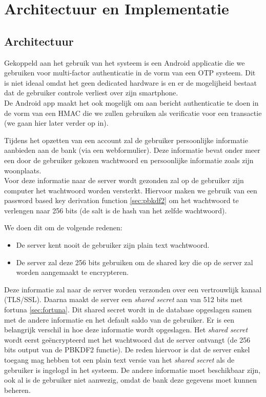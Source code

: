 \documentclass[11pt]{article}
\begin{document}
\section{Architectuur en Implementatie}
\subsection{Architectuur}
Gekoppeld aan het gebruik van het systeem is een Android applicatie die we gebruiken voor multi-factor authenticatie in de vorm van een OTP systeem. Dit is niet ideaal omdat het geen dedicated hardware is en er de mogelijheid bestaat dat de gebruiker controle verliest over zijn smartphone.\\

De Android app maakt het ook mogelijk om aan bericht authenticatie te doen in de vorm van een HMAC die we zullen gebruiken als verificatie voor een transactie (we gaan hier later verder op in).

Tijdens het opzetten van een account zal de gebruiker persoonlijke informatie aanbieden aan de bank (via een webformulier). Deze informatie bevat onder meer een door de gebruiker gekozen wachtwoord en persoonlijke informatie zoals zijn  woonplaats.\\

Voor deze informatie naar de server wordt gezonden zal op de gebruiker zijn computer het wachtwoord worden versterkt. Hiervoor maken we gebruik van een password based key derivation function \ref{sec:pbkdf2}\cite{death_of_clever} om het wachtwoord te verlengen naar 256 bits (de salt is de hash van het zelfde wachtwoord). 

We doen dit om de volgende redenen:
\begin{itemize}
\item De server kent nooit de gebruiker zijn plain text wachtwoord. 
\item De server zal deze 256 bits gebruiken om de shared key die op de server zal worden aangemaakt te encrypteren.
\end{itemize}

Deze informatie zal naar de server worden verzonden over een vertrouwlijk kanaal (TLS/SSL). 
Daarna maakt de server een \emph{shared secret} aan van 512 bits met fortuna \ref{sec:fortuna}. Dit shared secret wordt in de database opgeslagen samen met de andere informatie en het default saldo van de gebruiker. Er is een belangrijk verschil in hoe deze informatie wordt opgeslagen. Het \emph{shared secret} wordt eerst ge\"encrypteerd met het wachtwoord dat de server ontvangt (de 256 bits output van de PBKDF2 functie). De reden hiervoor is dat de server enkel toegang mag hebben tot een plain text versie van het \emph{shared secret} als de gebruiker is ingelogd in het systeem. De andere informatie moet beschikbaar zijn, ook al is de gebruiker niet aanwezig, omdat de bank deze gegevens moet kunnen beheren.
\end{document}
